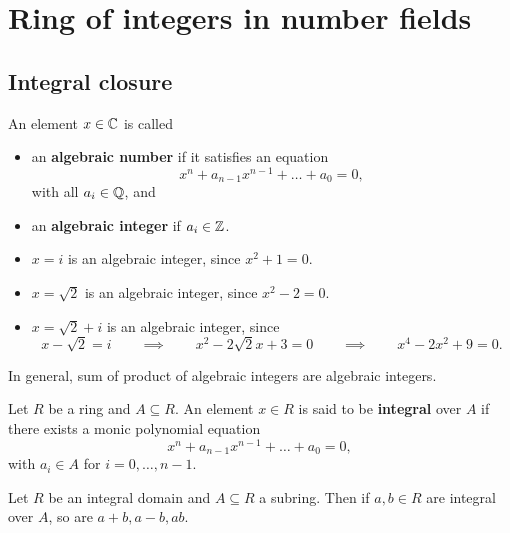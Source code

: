 \pagebreak

\section{Ring of integers in number fields}

\subsection{Integral closure}

\begin{definition}
An element $ x \in \mathbb{C} $ is called
\begin{itemize}
\item an \textbf{algebraic number} if it satisfies an equation
$$ x^n + a_{n - 1}x^{n - 1} + \dots + a_0 = 0, $$
with all $ a_i \in \mathbb{Q} $, and
\item an \textbf{algebraic integer} if $ a_i \in \mathbb{Z} $.
\end{itemize}
\end{definition}

\begin{example*}
\hfill
\begin{itemize}
\item $ x = i $ is an algebraic integer, since $ x^2 + 1 = 0 $.
\item $ x = \sqrt{2} $ is an algebraic integer, since $ x^2 - 2 = 0 $.
\item $ x = \sqrt{2} + i $ is an algebraic integer, since
$$ x - \sqrt{2} = i \qquad \implies \qquad x^2 - 2\sqrt{2}x + 3 = 0 \qquad \implies \qquad x^4 - 2x^2 + 9 = 0. $$
\end{itemize}
\end{example*}

In general, sum of product of algebraic integers are algebraic integers.

\begin{definition}
Let $ R $ be a ring and $ A \subseteq R $. An element $ x \in R $ is said to be \textbf{integral} over $ A $ if there exists a monic polynomial equation
$$ x^n + a_{n - 1}x^{n - 1} + \dots + a_0 = 0, $$
with $ a_i \in A $ for $ i = 0, \dots, n - 1 $.
\end{definition}

\begin{theorem}
\label{thm:integralsubring}
Let $ R $ be an integral domain and $ A \subseteq R $ a subring. Then if $ a, b \in R $ are integral over $ A $, so are $ a + b, a - b, ab $.
\end{theorem}

